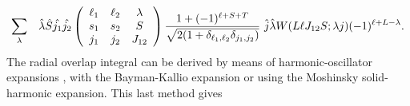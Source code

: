 \documentclass[11pt,a4paper]{article}
\begin{document}
\begin{eqnarray}
 \sum _ \lambda && \hat \lambda \hat S \hat {j_1} \hat {j_2}
  \left ( \begin{array}{ccc}\ell_1 & \ell_2 & \lambda\\
                            s_1    & s_2    & S \\
                            j_1    & j_2    & J_{12} \end{array}  \right )
         {1 + (-1)^{\ell +S+T} \over
    \sqrt {2(1 + \delta_{\ell_1 , \ell_2} \delta_{ j_1 ,j_2}) }} ~
\hat j \hat \lambda W(L \ell J_{12} S; \lambda j) (-1)^{\ell+L-\lambda} .
\end{eqnarray}
The radial overlap integral can be derived by means of harmonic-oscillator
expansions \cite{mosh60}, with the Bayman-Kallio expansion \cite{bay67}
or using the Moshinsky solid-harmonic expansion\cite{MOSH}. This last method gives
\end{document}
